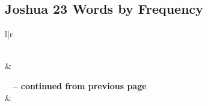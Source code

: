 

\subsection{Joshua 23 Words by Frequency}


\normalsize
 
\begin{center}
\begin{longtable}{l|r}
\caption[Joshua 23 Words by Frequency]{Joshua 23 Words by Frequency}\label{table:WordsbyFrequency for Joshua 23} \\
\hline {} &  \\ \hline 
\endfirsthead
 
{{\bfseries \tablename\ \thetable{} -- continued from previous page}} \\  
\hline {} &  \\ \hline 
\endhead
 

\end{longtable}
\end{center}
